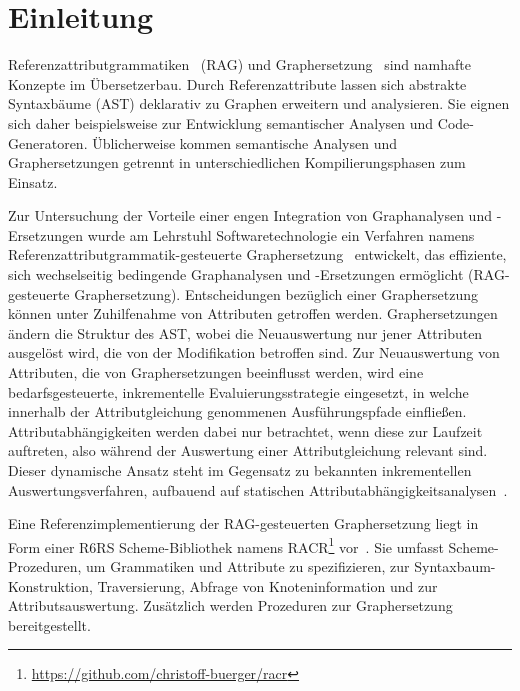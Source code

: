 

\chapter{Einleitung}

Referenzattributgrammatiken~\cite{Hedin2000} (RAG) und Graphersetzung~\cite{Rozenberg1997,Ehrig1999} sind namhafte Konzepte im Übersetzerbau. Durch Referenzattribute lassen sich abstrakte Syntaxbäume (AST) deklarativ zu Graphen erweitern und analysieren. Sie eignen sich daher beispielsweise zur Entwicklung semantischer Analysen und Code-Generatoren. Üblicherweise kommen semantische Analysen und Graphersetzungen getrennt in unterschiedlichen Kompilierungsphasen zum Einsatz.

Zur Untersuchung der Vorteile einer engen Integration von Graphanalysen und -Ersetzungen wurde am Lehrstuhl Softwaretechnologie ein Verfahren namens Referenzattributgrammatik-gesteuerte Graphersetzung~\cite{Buerger2015b} entwickelt, das effiziente, sich wechselseitig bedingende Graphanalysen und -Ersetzungen ermöglicht (RAG-gesteuerte Graphersetzung). Entscheidungen bezüglich einer Graphersetzung können unter Zuhilfenahme von Attributen getroffen werden. Graphersetzungen ändern die Struktur des AST, wobei die Neuauswertung nur jener Attributen ausgelöst wird, die von der Modifikation betroffen sind. Zur Neuauswertung von Attributen, die von Graphersetzungen beeinflusst werden, wird eine bedarfsgesteuerte, inkrementelle Evaluierungsstrategie eingesetzt, in welche innerhalb der Attributgleichung genommenen Ausführungspfade einfließen. Attributabhängigkeiten werden dabei nur betrachtet, wenn diese zur Laufzeit auftreten, also während der Auswertung einer Attributgleichung relevant sind. Dieser dynamische Ansatz steht im Gegensatz zu bekannten inkrementellen Auswertungsverfahren, aufbauend auf statischen Attributabhängigkeitsanalysen~\cite{Demers1981,MaddoxIII1997}.

Eine Referenzimplementierung der RAG-gesteuerten Graphersetzung liegt in Form einer R6RS Scheme-Bibliothek namens RACR\footnote{\url{https://github.com/christoff-buerger/racr}} vor~\cite{Buerger2012,Buerger2015b}. Sie umfasst Scheme-Prozeduren, um Grammatiken und Attribute zu spezifizieren, zur Syntaxbaum-Konstruktion, Traversierung, Abfrage von Knoteninformation und zur Attributsauswertung. Zusätzlich werden Prozeduren zur Graphersetzung bereitgestellt.

